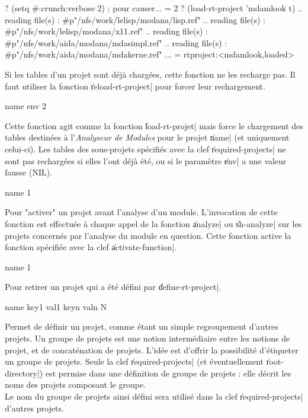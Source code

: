 \begin{Code*}
? (setq #:crunch:verbose 2) ; pour causer...
= 2
? (load-rt-project 'mdamlook t)
.. reading file(s) : #p"/nfs/work/lelisp/modana/lisp.ref"
.. reading file(s) : #p"/nfs/work/lelisp/modana/x11.ref"
.. reading file(s) : #p"/nfs/work/aida/modana/mdasimpl.ref"
.. reading file(s) : #p"/nfs/work/aida/modana/mdakerne.ref"
...
= rtproject:<mdamlook,loaded>
\end{Code*}

Si les tables d'un projet sont d\'{e}j\`{a} charg\'{e}es, cette fonction ne les
recharge pas. Il faut utiliser la fonction \|reload-rt-project| pour
forcer leur rechargement.

 {name env} {2}

Cette fonction agit comme la fonction \|load-rt-projet| mais force le
chargement des tables destin\'{e}es \`{a} l'{\em Analyseur de Modules} pour
le projet \|name| 
(et uniquement celui-ci). Les tables des sous-projets sp\'{e}cifi\'{e}s avec
la clef \|required-projects| ne sont pas recharg\'{e}es si elles l'ont
d\'{e}j\`{a} \'{e}t\'{e}, ou si le param\`{e}tre \|env| a une valeur fausse (NIL).

 {name} {1}

Pour "activer" un projet avant l'analyse d'un module. L'invocation
de cette fonction est effectu\'{e}e \`{a} chaque appel de la fonction
\|analyze| ou \|sh-analyze| sur les projets concern\'{e}s par l'analyse
du module en question. Cette fonction active la fonction sp\'{e}cifi\'{e}e
avec la clef \|activate-function|.

 {name} {1}

Pour retirer un projet qui a \'{e}t\'{e} d\'{e}fini par \|define-rt-project|.

 {name key1 val1 keyn valn} {N}

Permet de d\'{e}finir un projet, comme \'{e}tant
un simple regroupement d'autres projets. Un groupe de projets est une
notion interm\'{e}diaire entre les notions de projet, et de concat\'{e}nation
de projets. L'id\'{e}e est d'offrir la possibilit\'{e} d'\'{e}tiqueter un
groupe de projets.
Seule la clef \|required-projects| (et \'{e}ventuellement
\|root-directory|) est permise dans une d\'{e}finition de groupe de
projets : elle d\'{e}crit les noms des projets composant le groupe.\\
Le nom du groupe de projets ainsi d\'{e}fini sera utilis\'{e} dans la clef
\|required-projects| d'autres projets.

